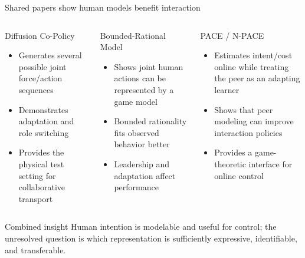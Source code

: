 \documentclass[aspectratio=169,11pt]{beamer}
\begin{document}
\begin{frame}[shrink=5]{Shared papers show human models benefit interaction}
\small
\begin{columns}[T,onlytextwidth]
\begin{block}{Diffusion Co-Policy}
\begin{itemize}
  \item Generates several possible joint force/action sequences
  \item Demonstrates adaptation and role switching
  \item Provides the physical test setting for collaborative transport
\end{itemize}
\end{block}
\begin{block}{Bounded-Rational Model}
\begin{itemize}
  \item Shows joint human actions can be represented by a game model
  \item Bounded rationality fits observed behavior better
  \item Leadership and adaptation affect performance
\end{itemize}
\end{block}
\begin{block}{PACE / N-PACE}
\begin{itemize}
  \item Estimates intent/cost online while treating the peer as an adapting learner
  \item Shows that peer modeling can improve interaction policies
  \item Provides a game-theoretic interface for online control
\end{itemize}
\end{block}
\end{columns}
\vspace{0.25cm}
\begin{alertblock}{Combined insight}
Human intention is modelable and useful for control; the unresolved question is which representation is sufficiently expressive, identifiable, and transferable.
\end{alertblock}
\end{frame}
\end{document}
